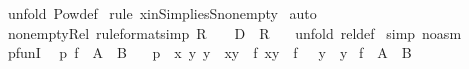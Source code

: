\begin{isabellebody}
%
\isadelimproof
%
\endisadelimproof
%
\isatagproof
{}\isamarkupfalse%
\ {\isacharparenleft}unfold\ Pow{\isacharunderscore}def{\isacharparenright}\isanewline
{}\isamarkupfalse%
\ {\isacharparenleft}rule\ x{\isacharunderscore}in{\isacharunderscore}S{\isacharunderscore}implies{\isacharunderscore}S{\isacharunderscore}nonempty{\isacharparenright}\isanewline
{}\isamarkupfalse%
\ auto\isanewline
{}\isamarkupfalse%
%
\endisatagproof
{\isafoldproof}%
%
\isadelimproof
\isanewline
%
\endisadelimproof
\isanewline
{}\isamarkupfalse%
\ nonempty{\isacharunderscore}Rel\ {\isacharbrackleft}rule{\isacharunderscore}format{\isacharcomma}simp{\isacharbrackright}{\isacharcolon}\ {\isachardoublequoteopen}R\ {\isachartilde}{\isacharequal}\ {\isacharbraceleft}{\isacharbraceright}\ {\isacharminus}{\isacharminus}{\isachargreater}\ {\isacharparenleft}D\ {\isacharless}{\isacharminus}{\isacharminus}{\isachargreater}\ R{\isacharparenright}\ {\isachartilde}{\isacharequal}\ {\isacharbraceleft}{\isacharbraceright}{\isachardoublequoteclose}\isanewline
%
\isadelimproof
%
\endisadelimproof
%
\isatagproof
{}\isamarkupfalse%
\ {\isacharparenleft}unfold\ rel{\isacharunderscore}def{\isacharparenright}\isanewline
{}\isamarkupfalse%
\ {\isacharparenleft}simp\ {\isacharparenleft}no{\isacharunderscore}asm{\isacharparenright}{\isacharparenright}\isanewline
{}\isamarkupfalse%
%
\endisatagproof
{\isafoldproof}%
%
\isadelimproof
%
\endisadelimproof
%
\isamarkuptrue%
\isamarkupfalse%
\ pfunI{\isacharcolon}\ \isanewline
{}\ p{}{\isacharcolon}\ {\isachardoublequoteopen}f\ {\isacharcolon}\ A\ {\isacharless}{\isacharminus}{\isacharminus}{\isachargreater}\ B{\isachardoublequoteclose}\ \ \isanewline
{}\ p{}{\isacharcolon}\ {\isachardoublequoteopen}{\isacharbang}{\isacharbang}\ x\ y{}\ y{}{\isachardot}\ {\isacharbrackleft}{\isacharbar}\ {\isacharparenleft}x{\isacharcomma}y{}{\isacharparenright}\ {\isacharcolon}\ f{\isacharsemicolon}\ {\isacharparenleft}x{\isacharcomma}y{}{\isacharparenright}\ {\isacharcolon}\ f\ {\isacharbar}{\isacharbrackright}\ {\isacharequal}{\isacharequal}{\isachargreater}\ y{}\ {\isacharequal}\ y{}{\isachardoublequoteclose}\isanewline
{}\ {\isachardoublequoteopen}f\ {\isacharcolon}\ A\ {\isacharminus}{\isacharbar}{\isacharminus}{\isachargreater}\ B{\isachardoublequoteclose}\isanewline

\end{isabellebody}
